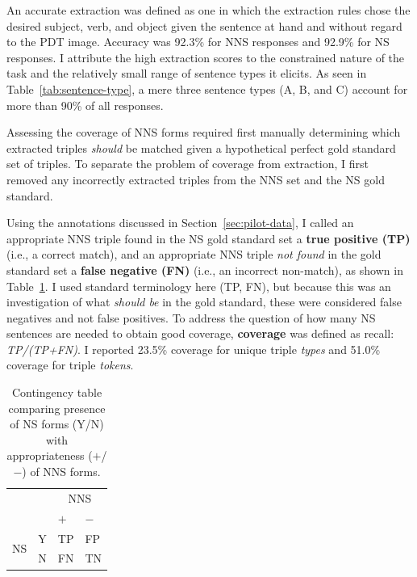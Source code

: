 An accurate extraction was defined as one in which the extraction rules chose the desired subject, verb, and object given the sentence at hand and without regard to the PDT image. Accuracy was 92.3\% for NNS responses and 92.9\% for NS responses. I attribute the high extraction scores to the constrained nature of the task and the relatively small range of sentence types it elicits. As seen in Table~\ref{tab:sentence-type}, a mere three sentence types (A, B, and C) account for more than 90\% of all responses.

Assessing the coverage of NNS forms required first manually determining which extracted triples \textit{should} be matched given a hypothetical perfect gold standard set of triples. To separate the problem of coverage from extraction, I first removed any incorrectly extracted triples from the NNS set and the NS gold standard.

Using the annotations discussed in Section~\ref{sec:pilot-data}, I called an appropriate NNS triple found in the NS gold standard set a \textbf{true positive (TP)} (i.e., a correct match), and an appropriate NNS triple \textit{not found} in the gold standard set a \textbf{false negative (FN)} (i.e., an incorrect non-match), as shown in Table~\ref{tab:contingencies}. I used standard terminology here (TP, FN), but because this was an investigation of what \emph{should be} in the gold standard, these were considered
false negatives and not false positives.  To address the question of
how many NS sentences are needed to obtain good coverage, \textbf{coverage} was defined as recall: \textit{TP/(TP+FN)}. I reported 23.5\% coverage for unique triple \textit{types} and 51.0\% coverage for triple \textit{tokens}.

\begin{table}[htb!]
\begin{center}
\begin{tabular}{|ll||l|l|}
  \hline
  & & \multicolumn{2}{c|}{NNS}\\
  & & $+$ & $-$ \\
  \hline
  \hline
  \multirow{2}{*}{NS} & Y & TP & FP \\
  \cline{2-4}
  & N & FN & TN\\
  \hline
\end{tabular}
\end{center}
\caption{Contingency table comparing presence of NS forms (Y/N) with
  appropriateness ($+$/$-$) of NNS forms.}
\label{tab:contingencies}
\end{table}

